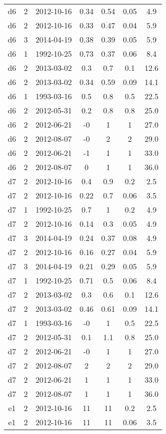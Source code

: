 \begin{table*}[htp]
\begin{tabular}{ccccccc}
d6 & 2 & 2012-10-16 & 0.34 & 0.54 & 0.05 & 4.9 \\
d6 & 2 & 2012-10-16 & 0.33 & 0.47 & 0.04 & 5.9 \\
d6 & 3 & 2014-04-19 & 0.38 & 0.39 & 0.05 & 5.9 \\
d6 & 1 & 1992-10-25 & 0.73 & 0.37 & 0.06 & 8.4 \\
d6 & 2 & 2013-03-02 & 0.3 & 0.7 & 0.1 & 12.6 \\
d6 & 2 & 2013-03-02 & 0.34 & 0.59 & 0.09 & 14.1 \\
d6 & 1 & 1993-03-16 & 0.5 & 0.8 & 0.5 & 22.5 \\
d6 & 2 & 2012-05-31 & 0.2 & 0.8 & 0.8 & 25.0 \\
d6 & 2 & 2012-06-21 & -0 & 1 & 1 & 27.0 \\
d6 & 2 & 2012-08-07 & -0 & 2 & 2 & 29.0 \\
d6 & 2 & 2012-06-21 & -1 & 1 & 1 & 33.0 \\
d6 & 2 & 2012-08-07 & 0 & 1 & 1 & 36.0 \\
d7 & 2 & 2012-10-16 & 0.4 & 0.9 & 0.2 & 2.5 \\
d7 & 2 & 2012-10-16 & 0.22 & 0.7 & 0.06 & 3.5 \\
d7 & 1 & 1992-10-25 & 0.7 & 1 & 0.2 & 4.9 \\
d7 & 2 & 2012-10-16 & 0.14 & 0.3 & 0.05 & 4.9 \\
d7 & 3 & 2014-04-19 & 0.24 & 0.37 & 0.08 & 4.9 \\
d7 & 2 & 2012-10-16 & 0.16 & 0.27 & 0.04 & 5.9 \\
d7 & 3 & 2014-04-19 & 0.21 & 0.29 & 0.05 & 5.9 \\
d7 & 1 & 1992-10-25 & 0.71 & 0.5 & 0.06 & 8.4 \\
d7 & 2 & 2013-03-02 & 0.3 & 0.6 & 0.1 & 12.6 \\
d7 & 2 & 2013-03-02 & 0.46 & 0.61 & 0.09 & 14.1 \\
d7 & 1 & 1993-03-16 & -0 & 1 & 0.5 & 22.5 \\
d7 & 2 & 2012-05-31 & 0.1 & 1.1 & 0.8 & 25.0 \\
d7 & 2 & 2012-06-21 & -0 & 1 & 1 & 27.0 \\
d7 & 2 & 2012-08-07 & 2 & 2 & 2 & 29.0 \\
d7 & 2 & 2012-06-21 & 1 & 1 & 1 & 33.0 \\
d7 & 2 & 2012-08-07 & 1 & 1 & 1 & 36.0 \\
e1 & 2 & 2012-10-16 & 11 & 11 & 0.2 & 2.5 \\
e1 & 2 & 2012-10-16 & 11 & 11 & 0.06 & 3.5 \\

\end{tabular}
\end{table*}
